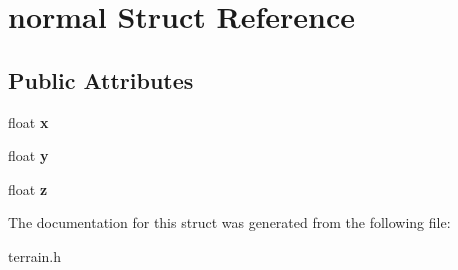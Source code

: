 \hypertarget{structnormal}{\section{normal \-Struct \-Reference}
\label{structnormal}
}
\subsection*{\-Public \-Attributes}
\begin{DoxyCompactItemize}
\item 
\hypertarget{structnormal_adf8ed3ad7d14185e97822107a59c836b}{float {\bfseries x}}\label{structnormal_adf8ed3ad7d14185e97822107a59c836b}

\item 
\hypertarget{structnormal_a8d6936cf9e8c16d17d375dfbff64b78a}{float {\bfseries y}}\label{structnormal_a8d6936cf9e8c16d17d375dfbff64b78a}

\item 
\hypertarget{structnormal_a1ab6375653fd98b346de62efd72fb735}{float {\bfseries z}}\label{structnormal_a1ab6375653fd98b346de62efd72fb735}

\end{DoxyCompactItemize}


\-The documentation for this struct was generated from the following file\-:\begin{DoxyCompactItemize}
\item 
terrain.\-h\end{DoxyCompactItemize}
